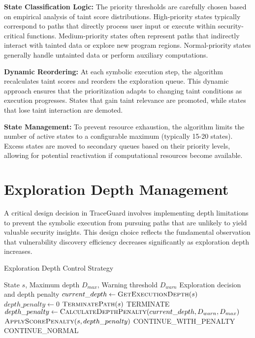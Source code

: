 \textbf{State Classification Logic:} The priority thresholds are carefully chosen based on empirical analysis of taint score distributions. High-priority states typically correspond to paths that directly process user input or execute within security-critical functions. Medium-priority states often represent paths that indirectly interact with tainted data or explore new program regions. Normal-priority states generally handle untainted data or perform auxiliary computations.

\textbf{Dynamic Reordering:} At each symbolic execution step, the algorithm recalculates taint scores and reorders the exploration queue. This dynamic approach ensures that the prioritization adapts to changing taint conditions as execution progresses. States that gain taint relevance are promoted, while states that lose taint interaction are demoted.

\textbf{State Management:} To prevent resource exhaustion, the algorithm limits the number of active states to a configurable maximum (typically 15-20 states). Excess states are moved to secondary queues based on their priority levels, allowing for potential reactivation if computational resources become available.

\section{Exploration Depth Management}

A critical design decision in TraceGuard involves implementing depth limitations to prevent the symbolic execution from pursuing paths that are unlikely to yield valuable security insights. This design choice reflects the fundamental observation that vulnerability discovery efficiency decreases significantly as exploration depth increases.

\begin{algorithm}
\caption{Exploration Depth Control Strategy}
\begin{algorithmic}[1]
\Require State $s$, Maximum depth $D_{max}$, Warning threshold $D_{warn}$
\Ensure Exploration decision and depth penalty
\State $current\_depth \gets \textsc{GetExecutionDepth}(s)$
\State $depth\_penalty \gets 0$
    \State $\textsc{TerminatePath}(s)$
    \State \Return \textsc{TERMINATE}
    \State $depth\_penalty \gets \textsc{CalculateDepthPenalty}(current\_depth, D_{warn}, D_{max})$
    \State $\textsc{ApplyScorePenalty}(s, depth\_penalty)$
    \State \Return \textsc{CONTINUE\_WITH\_PENALTY}
\Else
    \State \Return \textsc{CONTINUE\_NORMAL}
\EndIf
\end{algorithmic}
\end{algorithm}

